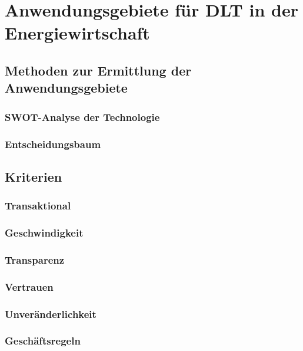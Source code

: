 \section{Anwendungsgebiete für DLT in der Energiewirtschaft}

\subsection{Methoden zur Ermittlung der Anwendungsgebiete}

\subsubsection{SWOT-Analyse der Technologie}

\subsubsection{Entscheidungsbaum}

\subsection{Kriterien}

\subsubsection{Transaktional}

\subsubsection{Geschwindigkeit}

\subsubsection{Transparenz}

\subsubsection{Vertrauen}

\subsubsection{Unveränderlichkeit}

\subsubsection{Geschäftsregeln}

